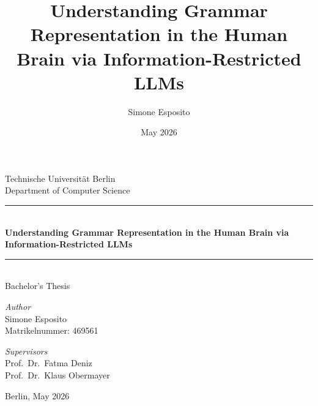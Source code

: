 \documentclass[a4paper]{article}
\title{Understanding Grammar Representation in the Human Brain via Information-Restricted LLMs}
\author{Simone Esposito}
\date{May 2026}
\begin{document}
 
\begin{center}
    {\large Technische Universität Berlin}\\[0.2em]
    {\small Department of Computer Science}\\[1cm]

    \rule{\textwidth}{1.5pt}\\[0.6em]
    {\LARGE\bfseries Understanding Grammar Representation in the Human Brain
    via Information-Restricted LLMs}\\[0.3em]
    \rule{\textwidth}{0.4pt}\\[1cm]

    {\large Bachelor's Thesis}\\[1cm]

    \begin{minipage}{0.45\textwidth}
        \begin{flushleft}
            \textit{Author}\\[0.2em]
            {\normalsize Simone Esposito}\\
            {\small Matrikelnummer: 469561}
        \end{flushleft}
    \end{minipage}
    \hfill
    \begin{minipage}{0.45\textwidth}
        \begin{flushright}
            \textit{Supervisors}\\[0.2em]
            {\normalsize Prof.\ Dr.\ Fatma Deniz}\\
            {\normalsize Prof.\ Dr.\ Klaus Obermayer}
        \end{flushright}
    \end{minipage}

    \vspace{0.6cm}
    {\small Berlin, May 2026}
\end{center}
\end{document}
